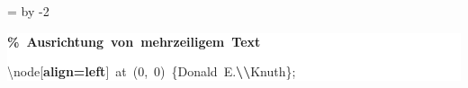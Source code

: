 \begingroup
\ttfamily
{}
=\textwidth
\advance{} by -2\fboxsep
\noindent
\colorbox{background}
{%
\parbox{\dimen255}
{%
\rule[-0.5ex]{0pt}{2.5ex}\hspace*{0.0em}\textcolor{G}{\textbf{\%~Ausrichtung~von~mehrzeiligem~Text}}\\
\rule[-0.5ex]{0pt}{2.5ex}\hspace*{0.0em}\textbackslash{}node[\textcolor{R}{\textbf{align=left}}]~at~(0,~0)~\{Donald~E.\textcolor{R}{\textbf{\textbackslash{}\textbackslash{}}}Knuth\};}%
}%
\endgroup

